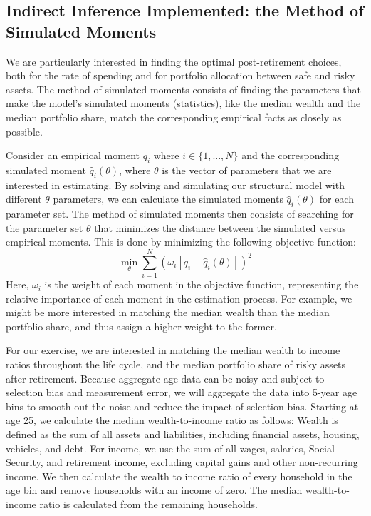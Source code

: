 \documentclass{article}
\begin{document}
\subsection{Indirect Inference Implemented: the Method of Simulated Moments}

We are particularly interested in finding the optimal post-retirement choices, both for the rate of spending and for portfolio allocation between safe and risky assets.
The method of simulated moments consists of finding the parameters that make the model's simulated moments (statistics), like the median wealth and the median portfolio share, match the corresponding empirical facts as closely as possible.

Consider an empirical moment $q_i$ where $i \in \{1,...,N\}$ and the corresponding simulated moment $\hat{q}_i(\theta)$, where $\theta$ is the vector of parameters that we are interested in estimating.
By solving and simulating our structural model with different $\theta$ parameters, we can calculate the simulated moments $\hat{q}_i(\theta)$ for each parameter set.
The method of simulated moments then consists of searching for the parameter set $\theta$ that minimizes the distance between the simulated versus empirical moments.
This is done by minimizing the following objective function:
\begin{equation}
\min_{\theta} \sum_{i=1}^{N}  \left( \omega_i [q_i - \hat{q}_i(\theta) ] \right)^2
\end{equation}
Here, $\omega_i$ is the weight of each moment in the objective function, representing the relative importance of each moment in the estimation process.
For example, we might be more interested in matching the median wealth than the median portfolio share, and thus assign a higher weight to the former.

For our exercise, we are interested in matching the median wealth to income ratios throughout the life cycle, and the median portfolio share of risky assets after retirement.
Because aggregate age data can be noisy and subject to selection bias and measurement error, we will aggregate the data into 5-year age bins to smooth out the noise and reduce the impact of selection bias.
Starting at age 25, we calculate the median wealth-to-income ratio as follows: Wealth is defined as the sum of all assets and liabilities, including financial assets, housing, vehicles, and debt.
For income, we use the sum of all wages, salaries, Social Security, and retirement income, excluding capital gains and other non-recurring income.
We then calculate the wealth to income ratio of every household in the age bin and remove households with an income of zero.
The median wealth-to-income ratio is calculated from the remaining households.
\end{document}
